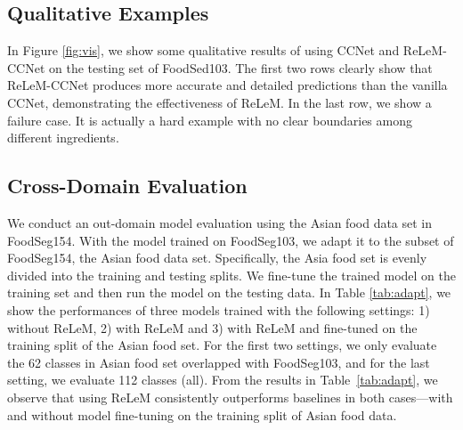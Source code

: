 \subsection{Qualitative Examples}
In Figure \ref{fig:vis}, we show some qualitative results of using CCNet and ReLeM-CCNet on the testing set of FoodSed103. 
The first two rows clearly show that ReLeM-CCNet produces more accurate and detailed predictions than the vanilla CCNet, demonstrating the effectiveness of ReLeM. 
In the last row, we show a failure case.
It is actually a hard example with no clear boundaries among different ingredients.

\subsection{Cross-Domain Evaluation}
We conduct an out-domain model evaluation using the Asian food data set in FoodSeg154. 
With the model trained on FoodSeg103, we adapt it to the subset of FoodSeg154, the Asian food data set. Specifically, the Asia food set is evenly divided into the training and testing splits. 
We fine-tune the trained model on the training set and then run the model on the testing data.
In Table \ref{tab:adapt}, 
we show the performances of three models trained with the following settings:
1) without ReLeM, 2) with ReLeM and 3) with ReLeM and fine-tuned on the training split of the Asian food set. 
For the first two settings, we only evaluate the 62 classes in Asian food set overlapped with FoodSeg103, and for the last setting, we evaluate 112 classes (all).
From the results in Table~\ref{tab:adapt}, we observe that using ReLeM consistently outperforms baselines in both cases---with and without model fine-tuning on the training split of Asian food data. 



